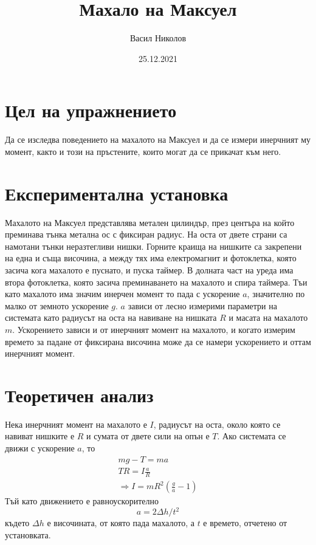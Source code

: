 \documentclass[aps, prb, twocolumn, a4paper, floatfix, reprint]{revtex4-2}
\begin{document}
\title{Махало на Максуел}
\author{Васил Николов}
\noaffiliation
\date{25.12.2021}
\maketitle

\section{Цел на упражнението}
Да се изследва поведението на махалото на Максуел и да се измери инерчният му момент, както и този на пръстените, които могат да се прикачат към него. 

\section{Експериментална установка}
Махалото на Максуел представлява метален цилиндър, през центъра на който преминава тънка метална ос с фиксиран радиус. На оста от двете страни са намотани тънки неразтегливи нишки. Горните краища на нишките са закрепени на една и съща височина, а между тях има електромагнит и фотоклетка, която засича кога махалото е пуснато, и пуска таймер. В долната част на уреда има втора фотоклетка, която засича преминаването на махалото и спира таймера. Тъи като махалото има значим инерчен момент то пада с ускорение $a$, значително по малко от земното ускорение $g$. $a$ зависи от лесно измерими параметри на системата като радиусът на оста на навиване на нишката $R$ и масата на махалото $m$. Ускорението зависи и от инерчният момент на махалото, и когато измерим времето за падане от фиксирана височина може да се намери ускорението и оттам инерчният момент. 

\section{Теоретичен анализ}
Нека инерчният момент на махалото е $I$, радиусът на оста, около която се навиват нишките е $R$ и сумата от двете сили на опън е $T$. Ако системата се движи с ускорение $a$, то
\begin{gather*}
    mg - T = ma \\
    TR = I\frac{a}{R} \\
    \Rightarrow I=mR^2(\frac{g}{a} - 1) \label{eq:1} \tag{1}
\end{gather*}
Тъй като движението е равноускорително 
\begin{equation*}
    a = 2\Delta h/t^2  
\end{equation*}
където $\Delta h$ е височината, от която пада махалото, а $t$ е времето, отчетено от установката. 
\end{document}
